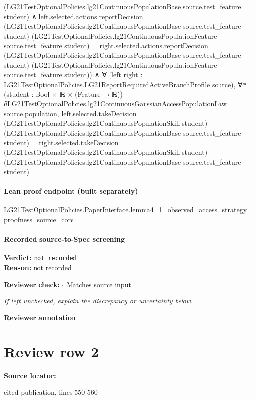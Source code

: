 \documentclass[10pt]{article}
\newcommand{\reviewerbox}{%
  \par\noindent\fbox{\parbox{0.96\linewidth}{\rule{0pt}{0.38in}}}\par
}
\newcommand{\reviewmatch}[1]{%
  \par\noindent\textbf{Reviewer check:} $\square$\; #1\par
  \noindent\emph{If left unchecked, explain the discrepancy or uncertainty below.}\par
}
\begin{document}
\begin{ReviewVerbatim}
                    (LG21TestOptionalPolicies.lg21ContinuousPopulationBase source.test_feature student) ∧
                left.selected.actions.reportDecision
                    (LG21TestOptionalPolicies.lg21ContinuousPopulationBase source.test_feature student)
                    (LG21TestOptionalPolicies.lg21ContinuousPopulationFeature source.test_feature student) =
                  right.selected.actions.reportDecision
                    (LG21TestOptionalPolicies.lg21ContinuousPopulationBase source.test_feature student)
                    (LG21TestOptionalPolicies.lg21ContinuousPopulationFeature source.test_feature student)) ∧
          ∀ (left right : LG21TestOptionalPolicies.LG21ReportRequiredActiveBranchProfile source),
            ∀ᵐ (student :
              Bool ×
                ℝ ×
                  (Feature → ℝ)) ∂LG21TestOptionalPolicies.lg21ContinuousGaussianAccessPopulationLaw source.population,
              left.selected.takeDecision (LG21TestOptionalPolicies.lg21ContinuousPopulationSkill student)
                  (LG21TestOptionalPolicies.lg21ContinuousPopulationBase source.test_feature student) =
                right.selected.takeDecision (LG21TestOptionalPolicies.lg21ContinuousPopulationSkill student)
                  (LG21TestOptionalPolicies.lg21ContinuousPopulationBase source.test_feature student)
\end{ReviewVerbatim}

\paragraph{Lean proof endpoint (built separately)}\begin{ReviewVerbatim}
LG21TestOptionalPolicies.PaperInterface.lemma4_1_observed_access_strategy_proofness_source_core
\end{ReviewVerbatim}

\paragraph{Recorded source-to-Spec screening}
\textbf{Verdict:} \texttt{not recorded}
\\
\textbf{Reason:} not recorded
\reviewmatch{Matches source input}
\noindent\textbf{Reviewer annotation}\par
\reviewerbox
\clearpage
\hypertarget{source-claim-967753ba3a07fa47}{}
\section*{Review row 2}
\textbf{Source locator:} {\footnotesize\raggedright cited publication, lines 550-\allowbreak{}560\par}
\end{document}
